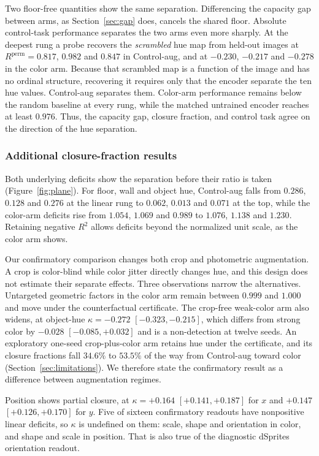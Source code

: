 \documentclass[10pt]{article}
\newcommand{\R}{R}
\begin{document}
Two floor-free quantities show the same separation. Differencing the capacity gap between arms, as
Section~\ref{sec:gap} does, cancels the shared floor. Absolute control-task performance separates
the two
arms even more sharply. At the
deepest rung a probe recovers the \emph{scrambled} hue map from held-out images at
$\R^{\mathrm{perm}} = 0.817$, $0.982$ and $0.847$ in Control-aug, and at $-0.230$, $-0.217$ and
$-0.278$ in the color arm. Because that scrambled map is a function of the image and has no
ordinal structure, recovering it requires only that the encoder separate the ten hue values.
Control-aug separates them. Color-arm performance remains below the random baseline at every rung,
while the matched untrained encoder reaches at least $0.976$. Thus, the capacity gap, closure
fraction, and control task agree on the direction of the hue separation.

\subsubsection*{Additional closure-fraction results}
Both underlying deficits show the separation before their ratio is taken
(Figure~\ref{fig:plane}). For floor, wall and object
hue, Control-aug falls from $0.286$, $0.128$ and $0.276$ at the linear rung to $0.062$, $0.013$ and
$0.071$ at the top, while the color-arm deficits rise from $1.054$, $1.069$ and $0.989$ to $1.076$,
$1.138$ and $1.230$. Retaining negative $R^2$ allows deficits beyond the normalized unit scale,
as the color arm shows.

Our confirmatory comparison changes both crop and photometric augmentation. A crop is color-blind
while color jitter directly changes hue, and this design does not estimate their separate effects.
Three observations narrow the alternatives. Untargeted geometric factors in the color arm remain
between $0.999$ and $1.000$ and move under the counterfactual certificate. The crop-free weak-color
arm also widens, at object-hue $\kappa=-0.272$ $[-0.323,-0.215]$, which differs from strong color by
$-0.028$ $[-0.085,+0.032]$ and is a non-detection at twelve seeds. An exploratory one-seed
crop-plus-color arm retains hue under the certificate, and its closure fractions fall $34.6\%$ to
$53.5\%$ of the way from Control-aug toward color (Section~\ref{sec:limitations}). We therefore
state the confirmatory result as a difference between augmentation regimes.

Position shows partial closure, at $\kappa=+0.164$ $[+0.141,+0.187]$ for $x$ and $+0.147$
$[+0.126,+0.170]$ for $y$. Five of sixteen confirmatory readouts have nonpositive linear deficits,
so $\kappa$ is undefined on them: scale, shape and orientation in color, and shape and scale in
position. That is also true of the diagnostic dSprites orientation readout.
\end{document}
